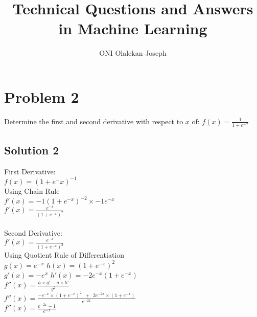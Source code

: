 \documentclass{article}
\begin{document}
\title{Technical Questions and Answers in Machine Learning}
\author{ONI Olalekan Joseph}

\maketitle

\section{Problem 2}
Determine the first and second derivative with respect to $x$ of: $f(x)= \frac{1}{1 + e^{-x}} $

\subsection{Solution 2}
 First Derivative: \\
 $f(x) = (1 + e^-x)^{-1}$ \\
 Using Chain Rule \\
 $f'(x) = -1(1 + e^{-x})^{-2} \times -1e^{-x}$ \\
 $f'(x) = \frac{e^{-x}}{(1 + e^{-x})^{2}}$ \\ \\
 
\noindent Second Derivative:  \\
 $f'(x) = \frac{e^{-x}}{(1 + e^{-x})^{2}}$ \\
 Using Quotient Rule of Differentiation \\
 $g(x) = e^{-x}$  \qquad  $h(x) = (1 + e^{-x})^{2}$ \\
 $ g'(x) = -e^{x} $ \qquad $h'(x) = -2e^{-x}(1 + e^{-x}) $ \\
 $f''(x) = \frac{h \times g' - g \times h' }{g^2}  $ \\
 $f''(x) = \frac{-e^{-x} \times (1 + e^{-x})^{2} \enspace + \enspace 2e^{-2x} \times (1 + e^{-x})}{e^{-2x}} $\\
 $f''(x) = \frac{e^{-2x} - 1}{e^{-x}} $
\end{document}
